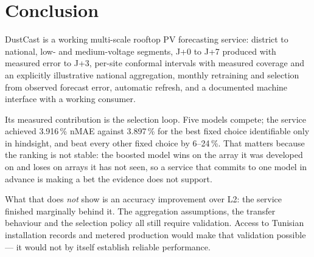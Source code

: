 \documentclass[11pt,a4paper]{article}
\begin{document}
\section{Conclusion}

DustCast is a working multi-scale rooftop PV forecasting service: district to
national, low- and medium-voltage segments, J+0 to J+7 produced with measured
error to J+3, per-site conformal intervals with measured coverage and an
explicitly illustrative national aggregation, monthly retraining and selection
from observed forecast error, automatic refresh, and a documented machine
interface with a working consumer.

Its measured contribution is the selection loop. Five models compete; the service
achieved 3.916\,\% nMAE against 3.897\,\% for the best fixed choice identifiable
only in hindsight, and beat every other fixed choice by 6--24\,\%. That matters
because the ranking is not stable: the boosted model wins on the array it was
developed on and loses on arrays it has not seen, so a service that commits to
one model in advance is making a bet the evidence does not support.

What that does \emph{not} show is an accuracy improvement over L2: the service
finished marginally behind it. The aggregation assumptions, the transfer
behaviour and the selection policy all still require validation. Access to
Tunisian installation records and metered production would make that validation
possible --- it would not by itself establish reliable performance.
\end{document}
